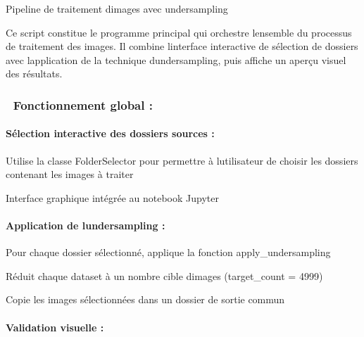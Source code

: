 Pipeline de traitement d\textquotesingle images avec undersampling

Ce script constitue le programme principal qui orchestre
l\textquotesingle ensemble du processus de traitement des images. Il
combine l\textquotesingle interface interactive de sélection de dossiers
avec l\textquotesingle application de la technique
d\textquotesingle undersampling, puis affiche un aperçu visuel des
résultats.

\subsubsection[🔧\textbf{ Fonctionnement global
:}]{\texorpdfstring{\protect\hypertarget{anchor-68}{}{}🔧\textbf{
Fonctionnement global
:}}{🔧 Fonctionnement global :}}\label{fonctionnement-global}

\paragraph[Sélection interactive des dossiers sources
:]{\texorpdfstring{\protect\hypertarget{anchor-69}{}{}Sélection
interactive des dossiers sources
:}{Sélection interactive des dossiers sources :}}\label{suxe9lection-interactive-des-dossiers-sources}

Utilise la classe FolderSelector pour permettre à
l\textquotesingle utilisateur de choisir les dossiers contenant les
images à traiter

Interface graphique intégrée au notebook Jupyter

\paragraph[Application de l\textquotesingle undersampling
:]{\texorpdfstring{\protect\hypertarget{anchor-70}{}{}Application de
l\textquotesingle undersampling
:}{Application de l\textquotesingle undersampling :}}\label{application-de-lundersampling}

Pour chaque dossier sélectionné, applique la fonction
apply\_undersampling

Réduit chaque dataset à un nombre cible d\textquotesingle images
(target\_count = 4999)

Copie les images sélectionnées dans un dossier de sortie commun

\paragraph[Validation visuelle
:]{\texorpdfstring{\protect\hypertarget{anchor-71}{}{}Validation
visuelle :}{Validation visuelle :}}\label{validation-visuelle}

